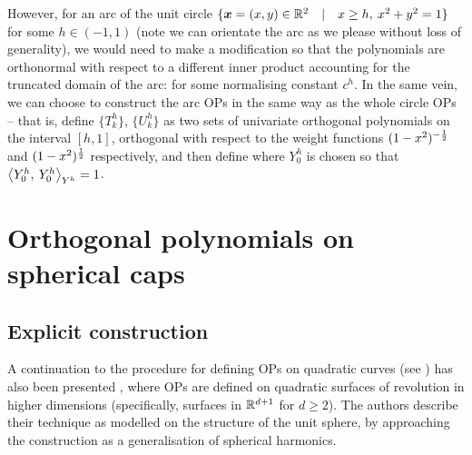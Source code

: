 However, for an arc of the unit circle $\{ \bm{x} = (x,y) \in \mathbb{R}^2 \quad | \quad x \ge h, \: x^2 + y^2 = 1 \}$ for some $h \in (-1, 1)$ (note we can orientate the arc as we please without loss of generality), we would need to make a modification so that the polynomials are orthonormal with respect to a different inner product accounting for the truncated domain of the arc:
for some normalising constant $c^h$. In the same vein, we can choose to construct the arc OPs in the same way as the whole circle OPs -- that is, define $\{T_k^h\}$, $\{U_k^h\}$ as two sets of univariate orthogonal polynomials on the interval $[h,1]$, orthogonal with respect to the weight functions $(1-x^2)^{-\frac{1}{2}}$ and $(1-x^2)^{\frac{1}{2}}$ respectively, and then define
where $Y_0^h$ is chosen so that $\ip< Y_0^h, \: Y_0^h >_{\ch^h} = 1$.



\section{Orthogonal polynomials on spherical caps}\label{section:sc:OPs}

\subsection{Explicit construction}

A continuation to the procedure for defining OPs on quadratic curves (see \cite{olver2021orthogonal}) has also been presented \cite{olver2020orthogonal}, where OPs are defined on quadratic surfaces of revolution in higher dimensions (specifically, surfaces in $\mathbb{R}^{d+1}$ for $d \ge 2$). The authors describe their technique as modelled on the structure of the unit sphere, by approaching the construction as a generalisation of spherical harmonics.

